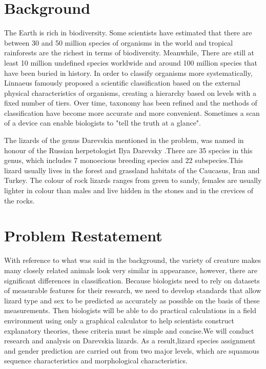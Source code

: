 \documentclass[12pt]{article}
\begin{document}
\tableofcontents

\newpage

\section{Background}
	
	The Earth is rich in biodiversity. Some scientists have estimated
	that there are between 30 and 50 million species of organisms in the
	world and tropical rainforests are the richest in terms of biodiversity.
	Meanwhile, There are still at least 10 million undefined species
	worldwide and around 100 million species that have been buried in
	history. In order to classify organisms more systematically, Linnaeus
	famously proposed a scientific classification based on the external
	physical characteristics of organisms, creating a hierarchy based on
	levels with a fixed number of tiers. Over time, taxonomy has been
	refined and the methods of classification have become more accurate and
	more convenient. Sometimes a scan of a device can enable biologists
	to "tell the truth at a glance".
	
	The lizards of the genus Darevskia mentioned in the problem, was named
	in honour of the Russian herpetologist Ilya Darevsky \cite{Darevskia}.There are
	35 species in this genus, which includes 7 monoecious breeding species
	and 22 subspecies.This lizard usually lives in the forest and grassland
	habitats of the Caucasus, Iran and Turkey. The colour of rock lizards
	ranges from green to sandy, females are usually lighter in colour than
	males and live hidden in the stones and in the crevices of the rocks.
	
\section{Problem Restatement}
	
	With reference to what was said in the background, the variety of creature
	makes many closely related animals look very similar in appearance,
	however, there are significant differences in classification. Because
	biologists need to rely on datasets of measurable features for their research,
	we need to develop standards that allow lizard type and sex to be predicted
	as accurately as possible on the basis of these measurements. Then biologists
	will be able to do practical calculations in a field environment using only a
	graphical calculator to help scientists construct explanatory theories, these
	criteria must be simple and concise.We will conduct research and analysis on
	Darevskia lizards. As a result,lizard species assignment and gender prediction
	are carried out from two major levels, which are squamous sequence characteristics
	and morphological characteristics.
	
\end{document}
